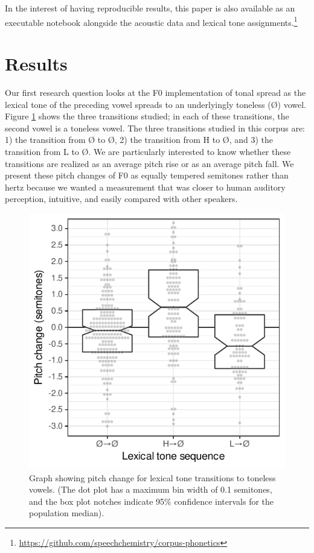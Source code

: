 \documentclass[
  11pt,
  b5paper,
]{article}
\begin{document}
In the interest of having reproducible results, this paper is also
available as an executable notebook alongside the acoustic data and
lexical tone assignments.\footnote{\url{https://github.com/speechchemistry/corpus-phonetics}}

\hypertarget{results}{%
\section{Results}\label{results}}

Our first research question looks at the F0 implementation of tonal
spread as the lexical tone of the preceding vowel spreads to an
underlyingly toneless (Ø) vowel. Figure \ref{fig:transition_to_toneless}
shows the three transitions studied; in each of these transitions, the
second vowel is a toneless vowel. The three transitions studied in this
corpus are: 1) the transition from Ø to Ø, 2) the transition from H to
Ø, and 3) the transition from L to Ø. We are particularly interested to
know whether these transitions are realized as an average pitch rise or
as an average pitch fall. We present these pitch changes of F0 as
equally tempered semitones rather than hertz because we wanted a
measurement that was closer to human auditory perception, intuitive, and
easily compared with other speakers.

\begin{figure}
\centering
\includegraphics{figure/plot_intervals_of_transitions_to_toneless_syllables-1.pdf}
\caption{Graph showing pitch change for lexical tone transitions to
toneless vowels. (The dot plot has a maximum bin width of 0.1 semitones,
and the box plot notches indicate 95\% confidence intervals for the
population median).\label{fig:transition_to_toneless}}
\end{figure}
\end{document}
